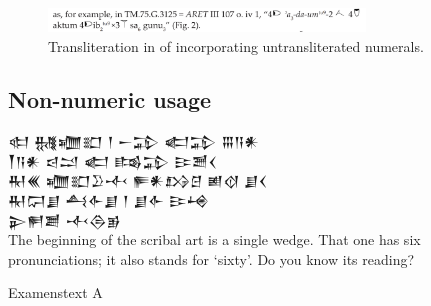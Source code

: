 \documentclass[10pt, a4paper, twoside]{article}
\newcommand{\recto}{\emph{recto}}
\begin{document}
\begin{figure}[H]
  \begin{center}
  \includegraphics[width=0.75\textwidth]{gori-163.png}
  \caption{Transliteration in \cite[163]{Gori2023} of \cite[\href{http://ebda.cnr.it/tablet/view/217\#13705}{\recto~4~1}]{P242293} incorporating untransliterated numerals.\label{GoriTransliteration}}
  \end{center}
\end{figure}

\subsection{Non-numeric usage}\label{non-numeric}
\epigraph{
{\nafont 𒊕 𒉆𒁾𒊬 𒁹 𒀸𒁉 \hfill 𒅗𒁉 𒐋𒀀𒀭\\
    \hspace*{2em} 𒐕𒀀𒀭 𒁀𒁺 \hfill 𒅗 𒌤𒁉 𒄿𒍪𒌋}\\
{\nafont 𒊑𒌍 𒁾𒊬𒊒𒋾 𒊓𒀭𒋳𒆪 𒅖𒋼 \hfill 𒋗𒌋 \\
    \hspace*{2em} 𒊑𒁶𒋗 𒋀𒅆𒋗 \hfill 𒁹 𒋗𒅆 𒄿𒆲 \\
    \hspace*{2em} 𒉌𒂍𒋢 \hfill 𒋾𒁲𒂊}\\
{The beginning of the scribal art is a single wedge.
That one has six pronunciations;
it also stands for `sixty'\footnotemark. Do you know its reading\footnotemark?}}{Examenstext A}
\addtocounter{footnote}{-1}
\end{document}
